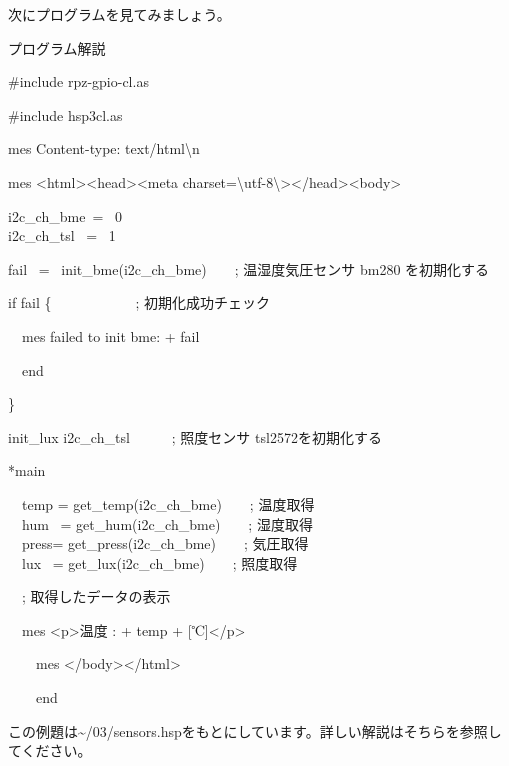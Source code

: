 \documentclass[a4paper,12pt,dvipdfmx]{jarticle}
\begin{document}
次にプログラムを見てみましょう。


\clearpage
プログラム解説



\centering
\begin{boxedminipage}{16.81cm}
	\#include {\textquotedbl}rpz-gpio-cl.as{\textquotedbl}

	\#include {\textquotedbl}hsp3cl.as{\textquotedbl}


	\bigskip

	mes {\textquotedbl}Content-type: text/html{\textbackslash}n{\textquotedbl}

	mes {\textquotedbl}{\textless}html{\textgreater}{\textless}head{\textgreater}{\textless}meta
	charset={\textbackslash}{\textquotedbl}utf-8{\textbackslash}{\textquotedbl}{\textgreater}{\textless}/head{\textgreater}{\textless}body{\textgreater}{\textquotedbl}


	\bigskip

	i2c\_ch\_bme\ = \ 0\\
	i2c\_ch\_tsl \ = \ 1

	\bigskip

	fail \ = \ init\_bme(i2c\_ch\_bme)\ \ \ \ ; 温湿度気圧センサ bm280
	を初期化する

	if fail \{\ \ \ \ \ \ \ \ \ \ \ \   ; 初期化成功チェック

	\ \ mes {\textquotedbl}failed to init bme: {\textquotedbl} + fail

	\ \ end

	\}


	\bigskip

	init\_lux i2c\_ch\_tsl\ \ \ \ \ \ ; 照度センサ
	tsl2572を初期化する


	\bigskip

	*main


	\bigskip

	\ \ temp = get\_temp(i2c\_ch\_bme)\ \ \ \ ; 温度取得\\
	\ \ hum \ = get\_hum(i2c\_ch\_bme)\ \ \ \ ; 湿度取得\\
	\ \ press= get\_press(i2c\_ch\_bme)\ \ \ \ ; 気圧取得\\
	\ \ lux \ = get\_lux(i2c\_ch\_bme)\ \ \ \ ; 照度取得\\


	\bigskip


	\bigskip

	\ \ ; 取得したデータの表示

	\ \ mes {\textquotedbl}{\textless}p{\textgreater}温度 : {\textquotedbl} + temp + {\textquotedbl}
	[℃]{\textless}/p{\textgreater}{\textquotedbl}


	\bigskip

	\ \ \ \ mes {\textquotedbl}{\textless}/body{\textgreater}{\textless}/html{\textgreater}{\textquotedbl}

	\ \ \ \ end
\end{boxedminipage}
\flushleft
この例題は\~{}/03/sensors.hspをもとにしています。詳しい解説はそちらを参照してください。
\end{document}
